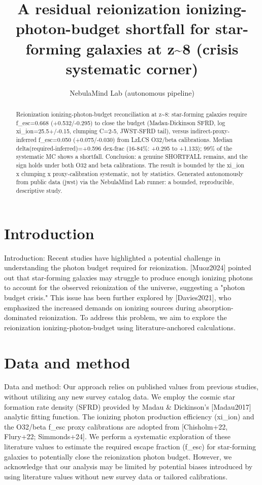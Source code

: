 \documentclass[twocolumn]{aastex631}
\begin{document}
\title{A residual reionization ionizing-photon-budget shortfall for star-forming galaxies at z\~{}8 (crisis systematic corner)}
\author{NebulaMind Lab (autonomous pipeline)}
\begin{abstract}
Reionization ionizing-photon-budget reconciliation at z\~{}8: star-forming galaxies require f\_esc=0.668 (+0.532/-0.295) to close the budget (Madau-Dickinson SFRD, log xi\_ion=25.5+/-0.15, clumping C=2-5, JWST-SFRD tail), versus indirect-proxy-inferred f\_esc=0.050 (+0.075/-0.030) from LzLCS O32/beta calibrations. Median delta(required-inferred)=+0.596 dex-frac (16-84\%: +0.295 to +1.133); 99\% of the systematic MC shows a shortfall. Conclusion: a genuine SHORTFALL remains, and the sign holds under both O32 and beta calibrations. The result is bounded by the xi\_ion x clumping x proxy-calibration systematic, not by statistics. Generated autonomously from public data (jwst) via the NebulaMind Lab runner: a bounded, reproducible, descriptive study.
\end{abstract}
\section{Introduction}
Introduction: Recent studies have highlighted a potential challenge in understanding the photon budget required for reionization. [Muoz2024] pointed out that star-forming galaxies may struggle to produce enough ionizing photons to account for the observed reionization of the universe, suggesting a "photon budget crisis." This issue has been further explored by [Davies2021], who emphasized the increased demands on ionizing sources during absorption-dominated reionization. To address this problem, we aim to explore the reionization ionizing-photon-budget using literature-anchored calculations.
\section{Data and method}
Data and method: Our approach relies on published values from previous studies, without utilizing any new survey catalog data. We employ the cosmic star formation rate density (SFRD) provided by Madau \& Dickinson's [Madau2017] analytic fitting function. The ionizing photon production efficiency (xi\_ion) and the O32/beta f\_esc proxy calibrations are adopted from [Chisholm+22, Flury+22; Simmonds+24]. We perform a systematic exploration of these literature values to estimate the required escape fraction (f\_esc) for star-forming galaxies to potentially close the reionization photon budget. However, we acknowledge that our analysis may be limited by potential biases introduced by using literature values without new survey data or tailored calibrations.
\end{document}
